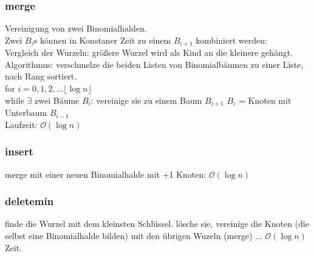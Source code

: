 \subsubsection{merge}
Vereinigung von zwei Binomialhalden.\\
Zwei $B_i$s können in Konstaner Zeit zu einem $B_{i+1}$ kombiniert werden:\\
Vergleich der Wurzeln: größere Wurzel wird als Kind an die kleinere gehängt.\\
Algorithmus: verschmelze die beiden Listen von Binomialbäumen zu einer Liste, nach Rang sortiert.\\
for $i = 0,1,2,... \lfloor \log n \rfloor$\\
while $\exists$ zwei Bäume $B_i$: vereinige sie zu einem Baum $B_{i+1}$
$B_i$ = Knoten mit Unterbaum $B_{i-1}$\\
Laufzeit: $\mathcal{O}(\log n)$\\
\subsubsection{insert}
merge mit einer neuen Binomialhalde mit +1 Knoten: $\mathcal{O}(\log n)$
\subsubsection{deletemin}
finde die Wurzel mit dem kleinsten Schlüssel. lösche sie, vereinige die Knoten (die selbst eine Binomialhalde bilden) mit den übrigen Wuzeln (merge) ... $\mathcal{O}(\log n)$ Zeit.